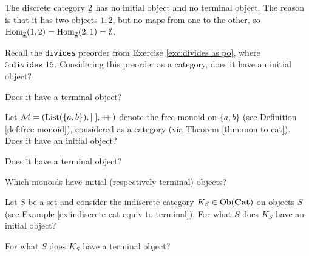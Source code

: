 \documentclass[CT4S-EN-RU]{subfiles}
\begin{document}
\begin{example}
\end{example}

\begin{example}
The discrete category $\underline{2}$ has no initial object and no terminal object. The reason is that it has two objects $1,2$, but no maps from one to the other, so $\textnormal{Hom}_{\underline{2}}(1,2)=\textnormal{Hom}_{\underline{2}}(2,1)=\emptyset$.
\end{example}

\begin{example}
\end{example}

\begin{exercise}
Recall the {\tt divides} preorder from Exercise \ref{exc:divides as po}, where $5\;{\tt divides}\;15$.
\sexc Considering this preorder as a category, does it have an initial object?
\item Does it have a terminal object?
\endsexc
\end{exercise}

\begin{exercise}
\end{exercise}

\begin{exercise}
Let $\mathcal{M}=(\textnormal{List}(\{a,b\}),[\;],+\!\!+\hspace{1pt})$ denote the free monoid on $\{a,b\}$ (see Definition \ref{def:free monoid}), considered as a category (via Theorem \ref{thm:mon to cat}).
\sexc Does it have an initial object?
\item Does it have a terminal object?
\item Which monoids have initial (respectively terminal) objects?
\endsexc
\end{exercise}

\begin{exercise}
\end{exercise}

\begin{exercise}
Let $S$ be a set and consider the indiscrete category $K_S\in\textnormal{Ob}({\bf Cat})$ on objects $S$ (see Example \ref{ex:indiscrete cat equiv to terminal}).
\sexc For what $S$ does $K_S$ have an initial object?
\item For what $S$ does $K_S$ have a terminal object?
\endsexc
\end{exercise}

\begin{exercise}
\end{exercise}

\end{document}
